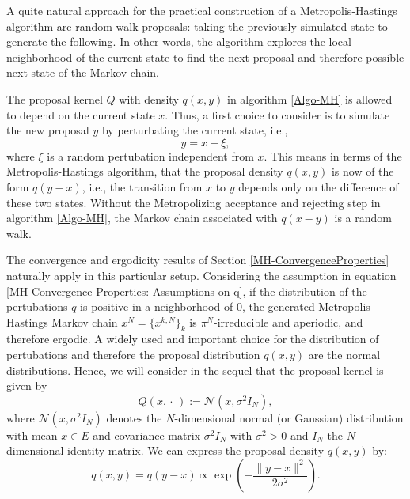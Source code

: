 A quite natural approach for the practical construction of a Metropolis-Hastings algorithm are random walk proposals: taking the previously simulated state to generate the following. In other words, the algorithm explores the local neighborhood of the current state to find the next proposal and therefore possible next state of the Markov chain.

The proposal kernel $Q$ with density $ q(x,y) $ in algorithm \ref{Algo-MH} is allowed to depend on the current state $x$. Thus, a first choice to consider is to simulate the new proposal $ y $ by perturbating the current state, i.e.,
\begin{equation}
 \label{MH-RWM:RWM-proposals, First choice}
 y = x + \xi,
\end{equation}
where $ \xi $ is a random pertubation independent from $ x $. This means in terms of the Metropolis-Hastings algorithm, that the proposal density $ q(x,y) $ is now of the form $ q(y-x) $, i.e., the transition from $x$ to $y$ depends only on the difference of these two states. Without the Metropolizing acceptance and rejecting step in algorithm \ref{Algo-MH}, the Markov chain associated with $q(x-y)$ is a random walk.


The convergence and ergodicity results of Section \ref{MH-ConvergenceProperties} naturally apply in this particular setup. Considering the assumption in equation \ref{MH-Convergence-Properties: Assumptions on q}, if the distribution of the pertubations $q$ is positive in a neighborhood of 0, the generated Metropolis-Hastings Markov chain $ x^{N} = \{ x^{k,N} \}_{k} $ is $ \pi^{N} $-irreducible and aperiodic, and therefore ergodic. A widely used and important choice for the distribution of pertubations and therefore the proposal distribution $ q(x,y) $ are the normal distributions. Hence, we will consider in the sequel that the proposal kernel is given by
\begin{equation}
 Q(x. \, \cdot \,) := \mathcal{N}(x, \sigma^2 I_{N} ),
\end{equation}
where $ \mathcal{N}(x, \sigma^2 I_{N} ) $ denotes the $N$-dimensional normal (or Gaussian) distribution with mean $x \in E$ and covariance matrix $ \sigma^2 I_{N} $ with $ \sigma^2 > 0 $ and $ I_{N} $ the $N$-dimensional identity matrix. We can express the proposal density $ q(x,y) $ by:
\begin{equation}
 q(x,y) = q(y-x) \varpropto  \exp{ \left( - \frac{ \| y-x \|^2 }{2 \sigma^2} \right) }.
\end{equation}

